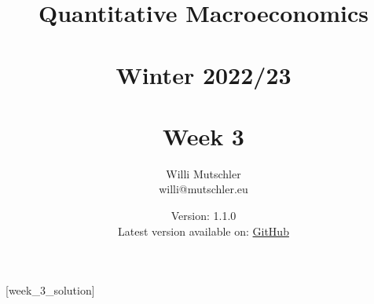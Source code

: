 
\newif\ifDisplaySolutions%


\title{Quantitative Macroeconomics\\~\\Winter 2022/23\\~\\Week 3}
\author{Willi Mutschler\\willi@mutschler.eu}
\date{Version: 1.1.0\\Latest version available on: \href{https://github.com/wmutschl/Quantitative-Macroeconomics/releases/latest/download/week_3.pdf}{GitHub}}
\maketitle\thispagestyle{empty}

\newpage
{}[week_3_solution]
\tableofcontents\thispagestyle{empty}\newpage

\setcounter{page}{1}
\newpage
\newpage
\newpage
\newpage
\printbibliography
\newpage

\ifDisplaySolutions
\newpage
\appendix
\section{Solutions}

\fi
